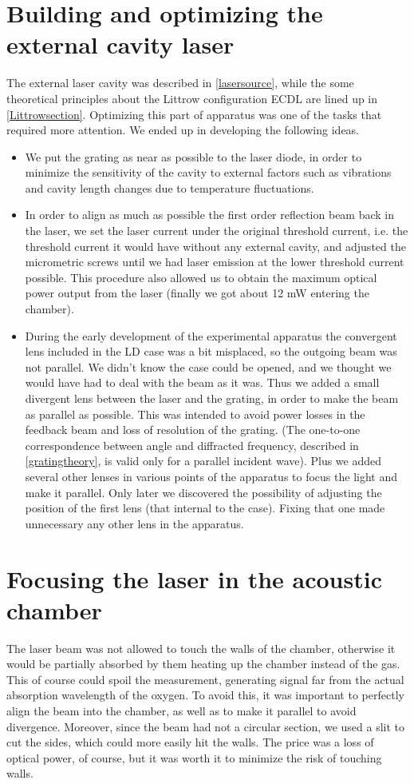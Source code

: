 	\section{Building and optimizing the external cavity laser}
The external laser cavity was described in \cref{lasersource}, while the some theoretical principles about the Littrow configuration ECDL are lined up in \cref{Littrowsection}. Optimizing this part of apparatus was one of the tasks that required more attention. We ended up in developing the following ideas.
\begin{itemize}
\item We put the grating as near as possible to the laser diode, in order to minimize the sensitivity of the cavity to external factors such as vibrations and cavity length changes due to temperature fluctuations.
\item In order to align as much as possible the first order reflection beam back in the laser, we set the laser current under the original threshold current, i.e. the threshold current it would have without any external cavity, and adjusted the micrometric screws until we had laser emission at the lower threshold current possible. This procedure also allowed us to obtain the maximum optical power output from the laser (finally we got about 12 mW entering the chamber). 
\item During the early development of the experimental apparatus the convergent lens included in the LD case was a bit misplaced, so the outgoing beam was not parallel. We didn't know the case could be opened, and we thought we would have had to deal with the beam as it was. Thus we added a small divergent lens between the laser and the grating, in order to make the beam as parallel as possible. This was intended to avoid power losses in the feedback beam and loss of resolution of the grating. (The one-to-one correspondence between angle and diffracted frequency, described in \cref{gratingtheory}, is valid only for a parallel incident wave). Plus we added several other lenses in various points of the apparatus to focus the light and make it parallel. Only later we discovered the possibility of adjusting the position of the first lens (that internal to the case). Fixing that one made unnecessary any other lens in the apparatus.
\end{itemize}

	\section{Focusing the laser in the acoustic chamber}\label{focusing}
The laser beam was not allowed to touch the walls of the chamber, otherwise it would be partially absorbed by them heating up the chamber instead of the gas. This of course could spoil the measurement, generating signal far from the actual absorption wavelength of the oxygen. To avoid this, it was important to perfectly align the beam into the chamber, as well as to make it parallel to avoid divergence. Moreover, since the beam had not a circular section, we used a slit to cut the sides, which could more easily hit the walls. The price was a loss of optical power, of course, but it was worth it to minimize the risk of touching walls.

